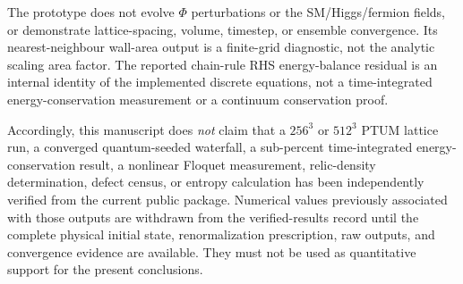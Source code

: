 \documentclass[epj]{svjour}
\begin{document}
The prototype does not evolve $\Phi$ perturbations or the
SM/Higgs/fermion fields, or demonstrate lattice-spacing, volume,
timestep, or ensemble convergence. Its nearest-neighbour wall-area
output is a finite-grid diagnostic, not the analytic scaling area
factor. The reported chain-rule RHS energy-balance residual is an
internal identity of the implemented discrete equations, not a
time-integrated energy-conservation measurement or a continuum
conservation proof.

Accordingly, this manuscript does \emph{not} claim that a
$256^3$ or $512^3$ PTUM lattice run, a converged quantum-seeded
waterfall, a sub-percent time-integrated energy-conservation result,
a nonlinear Floquet measurement, relic-density determination, defect
census, or entropy calculation has been independently verified from
the current public package. Numerical values previously associated
with those outputs are withdrawn from the verified-results record
until the complete physical initial state, renormalization prescription,
raw outputs, and convergence evidence are available. They must not be
used as quantitative support for the present conclusions.
\end{document}
